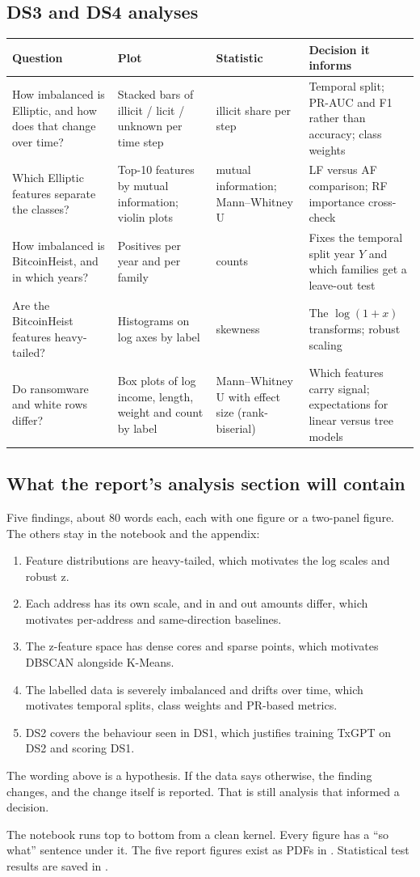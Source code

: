 \subsection{DS3 and DS4 analyses}

\begin{longtable}{@{}L{3.6cm}L{3.4cm}L{3.0cm}L{4.4cm}@{}}
\toprule
\textbf{Question} & \textbf{Plot} & \textbf{Statistic} & \textbf{Decision it informs} \\
\midrule
\endhead
How imbalanced is Elliptic, and how does that change over time? & Stacked bars of illicit / licit / unknown per time step & illicit share per step & Temporal split; PR-AUC and F1 rather than accuracy; class weights \\
Which Elliptic features separate the classes? & Top-10 features by mutual information; violin plots & mutual information; Mann--Whitney U & LF versus AF comparison; RF importance cross-check \\
How imbalanced is BitcoinHeist, and in which years? & Positives per year and per family & counts & Fixes the temporal split year $Y$ and which families get a leave-out test \\
Are the BitcoinHeist features heavy-tailed? & Histograms on log axes by label & skewness & The $\log(1+x)$ transforms; robust scaling \\
Do ransomware and white rows differ? & Box plots of log income, length, weight and count by label & Mann--Whitney U with effect size (rank-biserial) & Which features carry signal; expectations for linear versus tree models \\
\bottomrule
\end{longtable}

\subsection{What the report's analysis section will contain}

Five findings, about 80 words each, each with one figure or a two-panel figure. The others stay
in the notebook and the appendix:
\begin{enumerate}
  \item Feature distributions are heavy-tailed, which motivates the log scales and robust z.
  \item Each address has its own scale, and in and out amounts differ, which motivates per-address
    and same-direction baselines.
  \item The z-feature space has dense cores and sparse points, which motivates DBSCAN alongside
    K-Means.
  \item The labelled data is severely imbalanced and drifts over time, which motivates temporal
    splits, class weights and PR-based metrics.
  \item DS2 covers the behaviour seen in DS1, which justifies training TxGPT on DS2 and scoring
    DS1.
\end{enumerate}
The wording above is a hypothesis. If the data says otherwise, the finding changes, and the
change itself is reported. That is still analysis that informed a decision.

\begin{done}
The notebook runs top to bottom from a clean kernel. Every figure has a ``so what'' sentence
under it. The five report figures exist as PDFs in . Statistical test
results are saved in .
\end{done}
